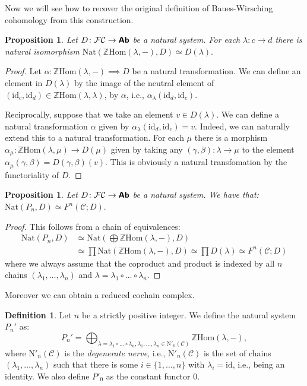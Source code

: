 \documentclass[12pt,reqno]{amsart}
\newtheorem{prop}[teo]{Proposition}
\theoremstyle{definition}
\newtheorem{defi}[teo]{Definition}
\theoremstyle{remark}
\numberwithin{figure}{section}%
\newcommand{\CC}{\mathcal{C}}
\newcommand{\F}{\mathcal{F}}
\newcommand{\id}{\mathrm{id}}
\newcommand{\N}{\mathrm{N}}
\newcommand{\Ab}{\textbf{\textsf{Ab}}}
\begin{document}
Now we will see how to recover the original definition of Baues-Wirsching cohomology from this construction.
\begin{prop}
Let $D\colon \F \CC \rightarrow \Ab$ be a natural system. For each $\lambda\colon c \rightarrow d$ there is natural isomorphism $\mathrm{Nat}( \mathbb{Z} \mathrm{Hom}(\lambda,-),D)\simeq D(\lambda).$
\end{prop}

\begin{proof}
        Let $\alpha \colon \mathbb{Z} \mathrm{Hom}(\lambda,-) \implies D$ be a natural transformation. We can define an element in $D(\lambda)$ by the image of the neutral element of $(\id_c,\id_d) \in \mathbb{Z} \mathrm{Hom}(\lambda,\lambda)$, by $\alpha$, i.e., $\alpha_{\lambda}(\id_d,\id_c) $. 
        
        Reciprocally, suppose that we take an element $v \in D(\lambda)$. We can define a natural transformation $\alpha$ given by $\alpha_\lambda(\id_d,\id_c)=v$. Indeed, we can naturally extend this to a natural transformation. For each $\mu$ there is a morphism $\alpha_\mu \colon  \mathbb{Z} \mathrm{Hom}(\lambda,\mu) \rightarrow D(\mu)$ given by taking any $(\gamma,\beta) \colon \lambda \rightarrow \mu$ to the element $\alpha_\mu(\gamma,\beta)=D(\gamma,\beta)(v).$ This is obviously a natural transfomation by the functoriality of $D$.
\end{proof}    

\begin{prop}\label{Natural_Transformations_Cochains}
    Let $D\colon \F \CC \rightarrow \Ab$ be a natural system. We have that: $\mathrm{Nat}(P_n,D)\simeq F^n(\CC;D).$
\end{prop}
\begin{proof}This follows from a chain of equivalences:
\begin{align*}
    \mathrm{Nat}(P_n,D)&\simeq \mathrm{Nat}(\bigoplus \mathbb{Z} \mathrm{Hom}(\lambda,-),D)\\& \simeq \prod \mathrm{Nat}( \mathbb{Z} \mathrm{Hom}(\lambda,-),D) \simeq \prod D(\lambda) \simeq F^n(\CC;D)
\end{align*}
     where we always assume that the coproduct and product is indexed by all $n$ chains $(\lambda_1, \dots , \lambda_n)$ and $\lambda=\lambda_1\circ \dots \circ \lambda_n$.
\end{proof}

Moreover we can obtain a reduced cochain complex. 
\begin{defi}
    Let $n$ be a strictly positive integer. We define the natural system $P_n'$ as: $$P_n'=\bigoplus_{\lambda=\lambda_1\circ \dots \circ \lambda_n,\lambda_1, \dots, \lambda_n \in\N'_n(\CC) } \mathbb{Z} \mathrm{Hom}(\lambda,-),$$ where $\N'_n(\CC)$ is the \textit{degenerate nerve}, i.e., $\N'_n(\CC)$ is the set of chains $(\lambda_1,\dots,\lambda_n)$ such that there is some $i\in\{1,\dots,n\}$ with $\lambda_i=\id$, i.e., being an identity. We also define $P'_0$ as the constant functor $0$.
\end{defi}
\end{document}
